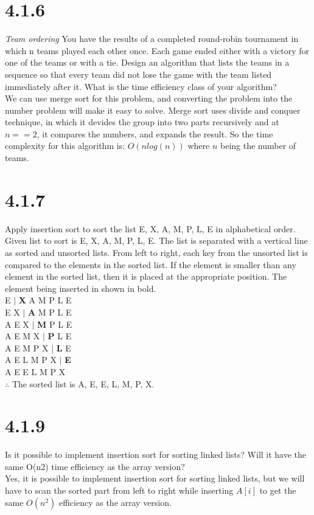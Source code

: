 \documentclass[8pt, letterpaper]{article}
\begin{document}
\section{4.1.6}
\textit{Team ordering} You have the results of a completed round-robin tournament in which n teams played each other once. Each game ended either with a victory for one of the teams or with a tie. Design an algorithm that lists the teams in a sequence so that every team did not lose the game with the team listed immediately after it. What is the time efficiency class of your algorithm? \\ 
\indent We can use merge sort for this problem, and converting the problem into the number problem will make it easy to solve. Merge sort uses divide and conquer technique, in which it devides the group into two parts recursively and at $n == 2$, it compares the numbers, and expands the result.
So the time complexity for this algorithm is: $O(nlog(n))$ where $n$ being the number of teams. 

\section{4.1.7}
Apply insertion sort to sort the list E, X, A, M, P, L, E in alphabetical order. \\
\indent Given list to sort is E, X, A, M, P, L, E. The list is separated with a vertical line as sorted and unsorted lists. From left to right, each key from the unsorted list is compared to the elements in the sorted list. If the element is smaller than any element in the sorted list, then it is placed at the appropriate position. The element being inserted in shown in bold. \\
E $|$ \textbf{X} A M P L E \\
E X $|$ \textbf{A} M P L E \\
A E X $|$ \textbf{M} P L E \\
A E M X $|$ \textbf{P} L E \\
A E M P X $|$ \textbf{L} E \\
A E L M P X $|$ \textbf{E} \\
A E E L M P X \\
$\mathrel{\therefore{}}$ The sorted list is A, E, E, L, M, P, X.

\section{4.1.9}
Is it possible to implement insertion sort for sorting linked lists? Will it have
the same O(n2) time efficiency as the array version? \\
\indent Yes, it is possible to implement insertion sort for sorting linked lists, but we will have to scan the sorted part from left to right while inserting $A[i]$ to get the same $O(n^2)$ efficiency as the array version.
\end{document}
